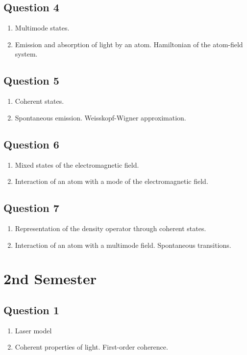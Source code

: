 \documentclass[12pt,a4paper]{article}
\begin{document}
\subsection*{Question 4} 
\begin{enumerate}
\item Multimode states. 
\item Emission and absorption of light by an atom. 
Hamiltonian of the atom-field system.
\end{enumerate}

\subsection*{Question 5} 
\begin{enumerate}
\item Coherent states. 
\item Spontaneous emission. Weisskopf-Wigner approximation.
\end{enumerate}

\subsection*{Question 6} 
\begin{enumerate}
\item Mixed states of the electromagnetic field. 
\item Interaction
of an atom with a mode of the electromagnetic field. 
\end{enumerate}

\subsection*{Question 7} 
\begin{enumerate}
\item Representation of the density operator through coherent
  states.
\item Interaction of an atom with a multimode field. Spontaneous transitions.
\end{enumerate}

\section*{2nd Semester}

\subsection*{Question 1} 
\begin{enumerate}
\item Laser model
\item Coherent properties of light.
 First-order coherence.
\end{enumerate}
\end{document}
